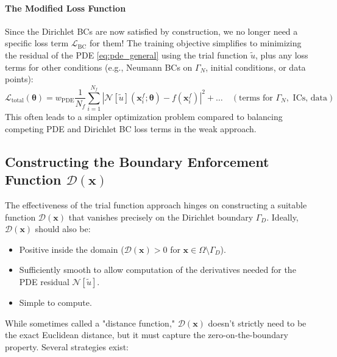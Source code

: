 \paragraph{The Modified Loss Function}
Since the Dirichlet BCs are now satisfied by construction, we no longer need a specific loss term $\mathcal{L}_{\text{BC}}$ for them! The training objective simplifies to minimizing the residual of the PDE \eqref{eq:pde_general} using the trial function $\tilde{u}$, plus any loss terms for other conditions (e.g., Neumann BCs on $\Gamma_N$, initial conditions, or data points):
%
\begin{equation*}
\mathcal{L}_{\text{total}}(\boldsymbol{\theta}) = w_{\text{PDE}} \frac{1}{N_f}\sum_{i=1}^{N_f} |\mathcal{N}[\tilde{u}](\mathbf{x}_i^f; \boldsymbol{\theta}) - f(\mathbf{x}_i^f)|^2 + \dots \quad (\text{terms for } \Gamma_N, \text{ ICs, data})
\end{equation*}
%
This often leads to a simpler optimization problem compared to balancing competing PDE and Dirichlet BC loss terms in the weak approach.

\subsection{Constructing the Boundary Enforcement Function $\mathcal{D}(\mathbf{x})$}
\label{subsec:distance_functions}

The effectiveness of the trial function approach hinges on constructing a suitable function $\mathcal{D}(\mathbf{x})$ that vanishes precisely on the Dirichlet boundary $\Gamma_D$. Ideally, $\mathcal{D}(\mathbf{x})$ should also be:
\begin{itemize}
    \item Positive inside the domain ($\mathcal{D}(\mathbf{x}) > 0$ for $\mathbf{x} \in \Omega \setminus \Gamma_D$).
    \item Sufficiently smooth to allow computation of the derivatives needed for the PDE residual $\mathcal{N}[\tilde{u}]$.
    \item Simple to compute.
\end{itemize}
While sometimes called a "distance function," $\mathcal{D}(\mathbf{x})$ doesn't strictly need to be the exact Euclidean distance, but it must capture the zero-on-the-boundary property. Several strategies exist:

